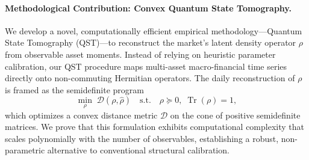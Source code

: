 \paragraph{Methodological Contribution: Convex Quantum State Tomography.} We
develop a novel, computationally efficient empirical methodology---Quantum State
Tomography (QST)---to reconstruct the market's latent density operator $\rho$ from
observable asset moments. Instead of relying on heuristic parameter calibration, our
QST procedure maps multi-asset macro-financial time series directly onto
non-commuting Hermitian operators. The daily reconstruction of $\rho$ is framed as
the semidefinite program
\begin{equation}\label{eq:qst-sdp-intro}
    \min_\rho \; \mathcal{D}(\rho, \hat{\rho}) \quad
    \text{s.t.} \quad \rho \succeq 0, \; \operatorname{Tr}(\rho) = 1,
\end{equation}
which optimizes a convex distance metric $\mathcal{D}$ on the cone of positive
semidefinite matrices. We prove that this formulation exhibits computational
complexity that scales polynomially with the number of observables, establishing a
robust, non-parametric alternative to conventional structural calibration.

